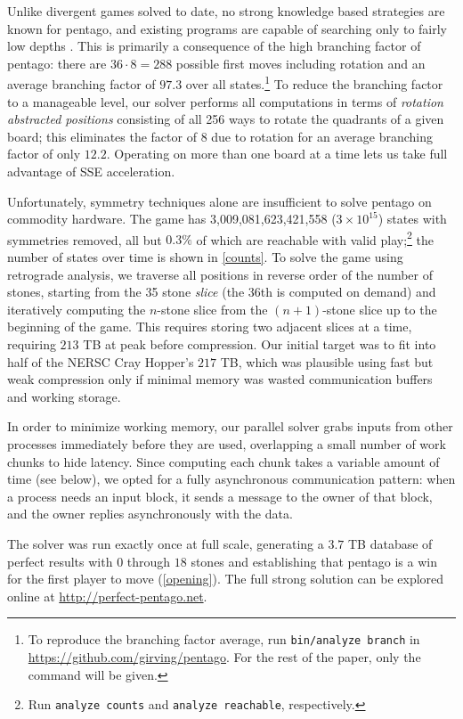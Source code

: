 \documentclass[conference]{IEEEtran}
\begin{document}
Unlike divergent games solved to date, no strong knowledge based strategies are known for pentago, and
existing programs are capable of searching only to fairly low depths \cite{buescher2009pentago,ewalds2012havannah}.
This is primarily a consequence of the high branching factor of pentago: there are
$36 \cdot 8 = 288$ possible first moves including rotation and an average branching factor of $97.3$ over all
states.\cprotect\footnote{To reproduce the branching factor average, run \verb+bin/analyze branch+ in
\url{https://github.com/girving/pentago}.  For the rest of the paper, only the command will be given.}
To reduce the branching factor to a manageable level, our solver performs all computations in terms of
\emph{rotation abstracted positions} consisting of all 256 ways to rotate the quadrants of a given board;
this eliminates the factor of 8 due to rotation for an average branching factor of only $12.2$.  Operating
on more than one board at a time lets us take full advantage of SSE acceleration.

Unfortunately, symmetry techniques alone are insufficient to solve pentago on commodity hardware.  The game has
3,009,081,623,421,558 ($3 \times 10^{15}$) states with symmetries removed, all but $0.3\%$ of which are reachable
with valid play;\cprotect\footnote{Run \verb+analyze counts+ and \verb+analyze reachable+, respectively.} the number of
states over time is shown in \autoref{counts}.  To solve the game using retrograde analysis, we traverse all
positions in reverse order of the number of stones, starting from the 35 stone \emph{slice} (the 36th is computed
on demand) and iteratively computing the $n$-stone slice from the $(n+1)$-stone slice up to the beginning of the game.
This requires storing two adjacent slices at a time, requiring $213$ TB at peak before compression.  Our initial
target was to fit into half of the NERSC Cray Hopper's $217$ TB, which was plausible using fast but weak compression
only if minimal memory was wasted communication buffers and working storage.

In order to minimize working memory, our parallel solver grabs inputs from other processes immediately before
they are used, overlapping a small number of work chunks to hide latency.  Since computing each chunk takes a variable
amount of time (see below), we opted for a fully asynchronous communication
pattern: when a process needs an input block, it sends a message to the owner of that block, and the owner
replies asynchronously with the data.

The solver was run exactly once at full scale, generating
a $3.7$ TB database of perfect results with $0$ through $18$ stones and establishing that pentago is a win for
the first player to move (\autoref{opening}).  The full strong solution can be explored online at
\url{http://perfect-pentago.net}.
\end{document}
